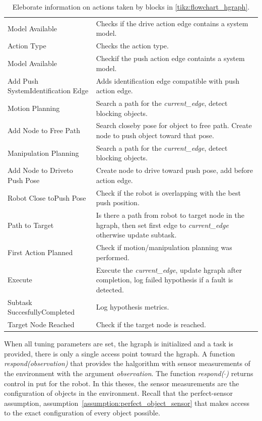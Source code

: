 \begin{table}[H]
\begin{tabular}[t]{>{\raggedright}p{3.5cm}>{\raggedright\arraybackslash}p{10.5cm}}
Model Available& Checks if the drive action edge contains a system model. \\
Action Type& Checks the action type. \\
Model Available& Checkif the push action edge containts a system model. \\
Add Push System\newline Identification Edge& Adds identification edge compatible with push action edge. \\
Motion Planning& Search a path for the \textit{current\_edge}, detect blocking objects. \\
Add Node to Free Path & Search closeby pose for object to free path. Create node to push object toward that pose. \\
Manipulation Planning & Search a path for the \textit{current\_edge}, detect blocking objects.\\
Add Node to Drive\newline to Push Pose& Create node to drive toward push pose, add before action edge. \\
Robot Close to\newline Push Pose & Check if the robot is overlapping with the best push position. \\
Path to Target& Is there a path from robot to target node in the \ac{hgraph}, then set first edge to \textit{current\_edge} otherwise update subtask.\\
First Action Planned&  Check if motion/manipulation planning was performed. \\
Execute& Execute the \textit{current\_edge}, update \ac{hgraph} after completion, log failed hypothesis if a fault is detected. \\
Subtask Succesfully\newline Completed& Log hypothesis metrics. \\
Target Node Reached& Check if the target node is reached.\\
\end{tabular}
\caption{Eleborate information on actions taken by blocks in \cref{tikz:flowchart_hgraph}.}%
\label{table:explainer_hgraph_figures_nodes}
\end{table}

When all tuning parameters are set, the \ac{hgraph} is initialized and a task is provided, there is only a single access point toward the \ac{hgraph}. A function \textit{respond(observation)} that provides the \ac{halgorithm} with sensor measurements of the environment with the argument \textit{observation}. The function \textit{respond($\cdot$)} returns control in put for the robot. In this theses, the sensor measurements are the configuration of objects in the environment. Recall that the perfect-sensor assumption, assumption~\ref{assumption:perfect_object_sensor} that makes access to the exact configuration of every object possible.\bs


